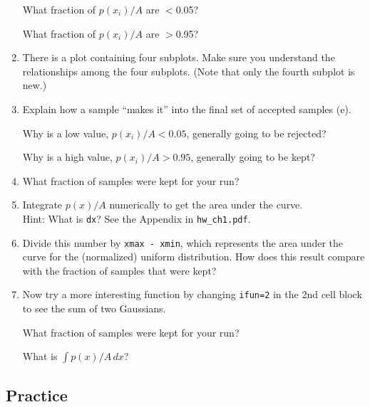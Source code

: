 \documentclass[11pt,titlepage,fleqn]{article}
\begin{document}
\begin{enumerate}
What fraction of $p(x_i)/A$ are $<$0.05?

What fraction of $p(x_i)/A$ are $>$0.95?

\vertgap

\item There is a plot containing four subplots. Make sure you understand the relationships among the four subplots. (Note that only the fourth subplot is new.)

\vertgap

\item Explain how a sample ``makes it'' into the final set of accepted samples (e).

Why is a low value, $p(x_i)/A < 0.05$, generally going to be rejected?

Why is a high value, $p(x_i)/A > 0.95$, generally going to be kept?

\vertgap

\item What fraction of samples were kept for your run?

\vertgap

\item Integrate $p(x)/A$ numerically to get the area under the curve. \\
Hint: What is \verb+dx+? See the Appendix in \verb+hw_ch1.pdf+.

\vertgap

\item Divide this number by \verb+xmax - xmin+, which represents the area under the curve for the (normalized) uniform distribution. How does this result compare with the fraction of samples that were kept?

\vertgap

\item Now try a more interesting function by changing \verb+ifun=2+ in the 2nd cell block to see the sum of two Gaussians.

What fraction of samples were kept for your run?

What is $\int p(x)/A \, dx$?

\end{enumerate}


\subsection*{Practice}
\end{document}
